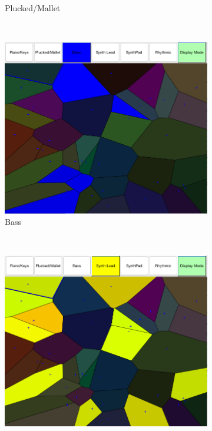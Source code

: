 \documentclass[11pt, oneside]{report}   	%
\begin{document}
\begin{figure}
\begin{subfigure}[b]{0.48\textwidth}
		\caption{Plucked/Mallet}
		\label{fig:categoriesPluckedMallet}
	\end{subfigure}
\\ 
\begin{subfigure}[b]{0.48\textwidth}
	\includegraphics[width=\textwidth]{CategoryBass.png}
	\caption{Bass}
	\label{fig:categoriesBass}
\end{subfigure}
~ %
\begin{subfigure}[b]{0.48\textwidth}
	\includegraphics[trim={0 0 0.01cm 0}, clip, width=\textwidth]{CategorySynthLead.png}

\end{subfigure}
\end{figure}
\end{document}
